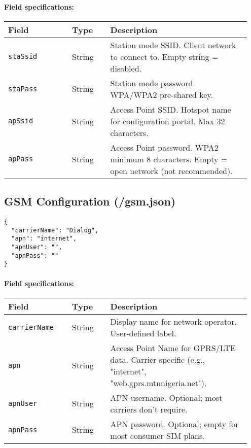 \documentclass[11pt,a4paper]{article}
\begin{document}
\paragraph{Field specifications:}
\begin{longtable}{>{\raggedright\arraybackslash}p{0.25\linewidth} p{0.15\linewidth} p{0.55\linewidth}}
\hline
\textbf{Field} & \textbf{Type} & \textbf{Description} \\
\hline
\endhead
\texttt{staSsid} & String & Station mode SSID. Client network to connect to. Empty string = disabled. \\
\texttt{staPass} & String & Station mode password. WPA/WPA2 pre-shared key. \\
\texttt{apSsid} & String & Access Point SSID. Hotspot name for configuration portal. Max 32 characters. \\
\texttt{apPass} & String & Access Point password. WPA2 minimum 8 characters. Empty = open network (not recommended). \\
\hline
\end{longtable}

\subsection{GSM Configuration (/gsm.json)}

\begin{verbatim}
{
  "carrierName": "Dialog",
  "apn": "internet",
  "apnUser": "",
  "apnPass": ""
}
\end{verbatim}

\paragraph{Field specifications:}
\begin{longtable}{>{\raggedright\arraybackslash}p{0.25\linewidth} p{0.15\linewidth} p{0.55\linewidth}}
\hline
\textbf{Field} & \textbf{Type} & \textbf{Description} \\
\hline
\endhead
\texttt{carrierName} & String & Display name for network operator. User-defined label. \\
\texttt{apn} & String & Access Point Name for GPRS/LTE data. Carrier-specific (e.g., "internet", "web.gprs.mtnnigeria.net"). \\
\texttt{apnUser} & String & APN username. Optional; most carriers don't require. \\
\texttt{apnPass} & String & APN password. Optional; empty for most consumer SIM plans. \\
\hline
\end{longtable}
\end{document}
